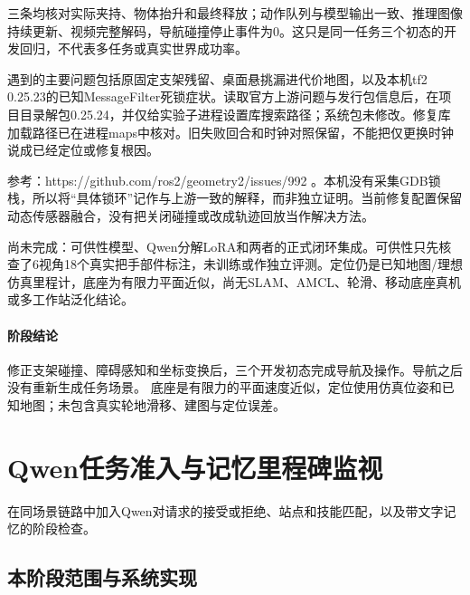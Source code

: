 三条均核对实际夹持、物体抬升和最终释放；动作队列与模型输出一致、推理图像持续更新、视频完整解码，导航碰撞停止事件为0。这只是同一任务三个初态的开发回归，不代表多任务或真实世界成功率。

遇到的主要问题包括原固定支架残留、桌面悬挑漏进代价地图，以及本机tf2 0.25.23的已知MessageFilter死锁症状。读取官方上游问题与发行包信息后，在项目目录解包0.25.24，并仅给实验子进程设置库搜索路径；系统包未修改。修复库加载路径已在进程maps中核对。旧失败回合和时钟对照保留，不能把仅更换时钟说成已经定位或修复根因。

参考：https://github.com/ros2/geometry2/issues/992 。本机没有采集GDB锁栈，所以将``具体锁环''记作与上游一致的解释，而非独立证明。当前修复配置保留动态传感器融合，没有把关闭碰撞或改成轨迹回放当作解决方法。

尚未完成：可供性模型、Qwen分解LoRA和两者的正式闭环集成。可供性只先核查了6视角18个真实把手部件标注，未训练或作独立评测。定位仍是已知地图/理想仿真里程计，底座为有限力平面近似，尚无SLAM、AMCL、轮滑、移动底座真机或多工作站泛化结论。



\paragraph{阶段结论}修正支架碰撞、障碍感知和坐标变换后，三个开发初态完成导航及操作。导航之后没有重新生成任务场景。 底座是有限力的平面速度近似，定位使用仿真位姿和已知地图；未包含真实轮地滑移、建图与定位误差。



\FloatBarrier

\section{Qwen任务准入与记忆里程碑监视}

\label{stage:s16}

在同场景链路中加入Qwen对请求的接受或拒绝、站点和技能匹配，以及带文字记忆的阶段检查。

\subsection{本阶段范围与系统实现}\label{s16-detail-1}

